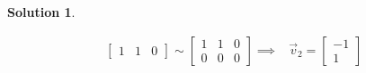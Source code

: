 \documentclass[10pt]{article}
\theoremstyle{definition}
\newtheorem{soln}{Solution}
\begin{document}
\begin{soln}
\begin{enumerate}[label=(\alph*)]
\begin{align*}
\begin{bmatrix}
              1 & 1 & 0
            \end{bmatrix}\sim
            \begin{bmatrix}
              1 & 1 & 0 \\
              0 & 0 & 0
            \end{bmatrix}
            \implies & \vec{v}_2=\begin{bmatrix}
                                   -1 \\
                                   1
                                 \end{bmatrix}
          \end{align*}
  \end{enumerate}
\end{soln}
\end{document}
